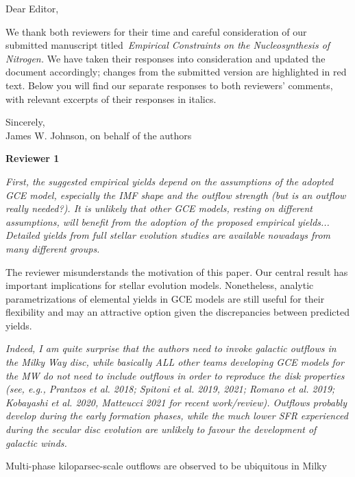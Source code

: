 \documentclass[12pt]{article}
\newcommand\doublebreak[0]{\par\null\par\noindent}
\begin{document}
\noindent
Dear Editor,
\par\null\par\noindent
We thank both reviewers for their time and careful consideration of our
submitted manuscript titled~\textit{Empirical Constraints on the
Nucleosynthesis of Nitrogen.}
We have taken their responses into consideration and updated the document
accordingly; changes from the submitted version are highlighted in red text.
Below you will find our separate responses to both reviewers' comments, with
relevant excerpts of their responses in italics.
\par\null\par\noindent
Sincerely,
\\
James W. Johnson, on behalf of the authors
\par\noindent
\begin{center}
\makebox[\linewidth]{\rule{0.5\textwidth}{0.4pt}}
\end{center}
\noindent
\begin{center}
\textbf{Reviewer 1}
\end{center}
\par\noindent
\textit{%
First, the suggested empirical yields depend on the assumptions of the adopted
GCE model, especially the IMF shape and the outflow strength (but is an outflow
really needed?).
It is unlikely that other GCE models, resting on different assumptions, will
benefit from the adoption of the proposed empirical yields...
Detailed yields from full stellar evolution studies are available nowadays from
many different groups.
}
\doublebreak
The reviewer misunderstands the motivation of this paper.
Our central result has important implications for stellar evolution models.
Nonetheless, analytic parametrizations of elemental yields in GCE models are
still useful for their flexibility and may an attractive option given the
discrepancies between predicted yields.
\doublebreak
\textit{%
Indeed, I am quite surprise that the authors need to invoke galactic outflows
in the Milky Way disc, while basically ALL other teams developing GCE models
for the MW do not need to include outflows in order to reproduce the disk
properties (see, e.g., Prantzos et al. 2018; Spitoni et al. 2019, 2021; Romano
et al. 2019; Kobayashi et al. 2020, Matteucci 2021 for recent work/review).
Outflows probably develop during the early formation phases, while the much
lower SFR experienced during the secular disc evolution are unlikely to favour
the development of galactic winds.
}
\doublebreak
Multi-phase kiloparsec-scale outflows are observed to be ubiquitous in Milky
\end{document}
